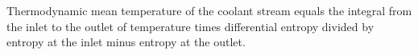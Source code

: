 Thermodynamic mean temperature of the coolant stream equals the integral from the inlet to the outlet of temperature times differential entropy divided by entropy at the inlet minus entropy at the outlet.